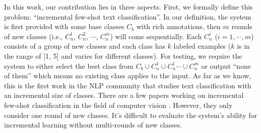 \documentclass[11pt]{article}
\begin{document}
In this work, our contribution lies in three aspects. First, we formally define this problem: ``incremental few-shot text classification''. In our definition, the system is first provided with some base classes $C_b$ with rich annotations, then $m$ rounds of new classes (i.e., $C^1_n$, $C^2_n$, $\cdots$, $C^m_n$) will come sequentially. Each $C^i_n$ ($i=1, \cdots, m$) consists of a group of new classes and each class has $k$ labeled examples ($k$ is in the range of [1, 5] and varies for different classes). For testing, we require the system to either select the best class from $C_b\cup C^1_n \cup C^1_n\cdots \cup C^m_n$ or output ``none of them'' which means no existing class applies to the input. As far as we know, this is the first work in the NLP community that studies text classification with an incremental size of classes. There are a few papers working on incremental few-shot classification in the field of computer vision \cite{DBLPRenLFZ19}. However, they only consider one round of new classes. It's difficult to evaluate the system's ability for incremental learning without multi-rounds of new classes.

\end{document}
